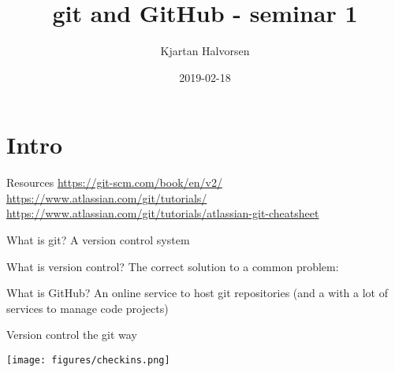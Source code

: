 \documentclass[presentation,aspectratio=1610]{beamer}
\author{Kjartan Halvorsen}
\date{2019-02-18}
\title{git and GitHub - seminar 1}
\begin{document}
\maketitle

\section{Intro}
\label{sec:org028eaa0}
\begin{frame}[label={sec:org7e86e0e}]{Resources}
\url{https://git-scm.com/book/en/v2/}
\url{https://www.atlassian.com/git/tutorials/}
\url{https://www.atlassian.com/git/tutorials/atlassian-git-cheatsheet}
\end{frame}

\begin{frame}[label={sec:orgb63dc4e}]{What is git?}
A version control system
\end{frame}

\begin{frame}[label={sec:orgf7d153e}]{What is version control?}
The \alert{correct} solution to a common problem:

\begin{LaTeX}
       \begin{center}
       \end{center}
\end{LaTeX}
\end{frame}



\begin{frame}[label={sec:org8de5e59}]{What is GitHub?}
An online service to host \alert{git} repositories (and a with a lot of services to manage code projects)
\end{frame}

\begin{frame}[label={sec:org7aca3cc}]{Version control the git way}
\begin{center}
\texttt{[image: figures/checkins.png]}
\end{center}
\end{frame}
\end{document}
